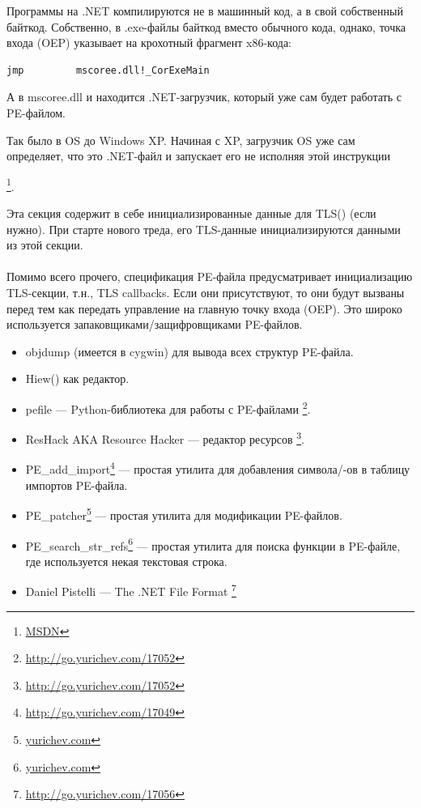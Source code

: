 
Программы на .NET компилируются не в машинный код, а в свой собственный байткод.
Собственно, в .exe-файлы байткод вместо обычного кода, однако, точка входа (\ac{OEP}) 
указывает на крохотный фрагмент x86-кода:

\begin{lstlisting}
jmp         mscoree.dll!_CorExeMain
\end{lstlisting}

А в mscoree.dll и находится .NET-загрузчик, который уже сам будет работать с PE-файлом.

Так было в \ac{OS} до Windows XP. Начиная с XP, загрузчик \ac{OS} уже сам определяет, что это
.NET-файл и запускает его не исполняя этой инструкции \JMP

\footnote{\href{http://go.yurichev.com/17051}{MSDN}}.


Эта секция содержит в себе инициализированные данные для \ac{TLS}() (если нужно).
При старте нового треда, его \ac{TLS}-данные инициализируются данными из этой секции. \\
\\
Помимо всего прочего, спецификация PE-файла предусматривает инициализацию \ac{TLS}-секции, т.н., TLS callbacks.
Если они присутствуют, то они будут вызваны перед тем как передать управление на главную точку входа (\ac{OEP}).
Это широко используется запаковщиками/защифровщиками PE-файлов.


\begin{itemize}
\item
{}
objdump (имеется в cygwin) для вывода всех структур PE-файла.

\item
{}
Hiew() как редактор.

\item pefile --- Python-библиотека для работы с PE-файлами
\footnote{\url{http://go.yurichev.com/17052}}.

\item
\label{ResHack}
ResHack \acs{AKA} Resource Hacker --- редактор ресурсов
\footnote{\url{http://go.yurichev.com/17052}}.

\item PE\_add\_import\footnote{\url{http://go.yurichev.com/17049}} --- простая утилита для добавления символа/-ов в таблицу импортов PE-файла.

\item PE\_patcher\footnote{\href{http://go.yurichev.com/17054}{yurichev.com}} --- простая утилита для модификации PE-файлов.

\item PE\_search\_str\_refs\footnote{\href{http://go.yurichev.com/17055}{yurichev.com}} --- простая утилита для поиска функции в PE-файле, где используется некая текстовая строка.
\end{itemize}


\begin{itemize}
\item Daniel Pistelli --- The .NET File Format \footnote{\url{http://go.yurichev.com/17056}}
\end{itemize}

